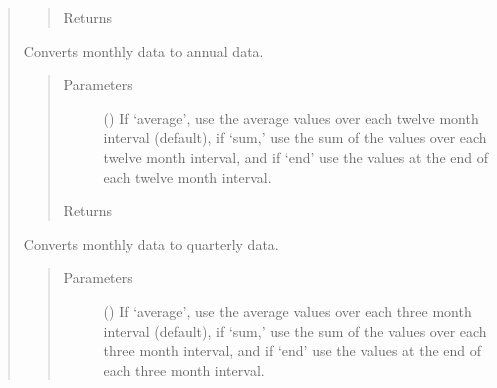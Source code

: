 \documentclass[letterpaper,10pt,openany,oneside,english]{sphinxmanual}
\begin{document}
\begin{fulllineitems}
\begin{quote}
\begin{fulllineitems}
\begin{quote}
\begin{description}
\item[{Returns}] \leavevmode
{\hyperref[\detokenize{series_class:fredpy.series}]{}}

\end{description}\end{quote}

\end{fulllineitems}


\begin{fulllineitems}
\label{\detokenize{series_class:fredpy.series.monthtoannual}}
Converts monthly data to annual data.
\begin{quote}\begin{description}
\item[{Parameters}] \leavevmode
{} () \textendash{} If ‘average’, use the average values over each twelve month interval (default), if ‘sum,’ use the sum of the values over each twelve month interval, and if ‘end’ use the values at the end of each twelve month interval.

\item[{Returns}] \leavevmode
{\hyperref[\detokenize{series_class:fredpy.series}]{}}

\end{description}\end{quote}

\end{fulllineitems}


\begin{fulllineitems}
\label{\detokenize{series_class:fredpy.series.monthtoquarter}}
Converts monthly data to quarterly data.
\begin{quote}\begin{description}
\item[{Parameters}] \leavevmode
{} () \textendash{} If ‘average’, use the average values over each three month interval (default), if ‘sum,’ use the sum of the values over each three month interval, and if ‘end’ use the values at the end of each three month interval.


\end{description}
\end{quote}
\end{fulllineitems}
\end{quote}
\end{fulllineitems}
\end{document}
